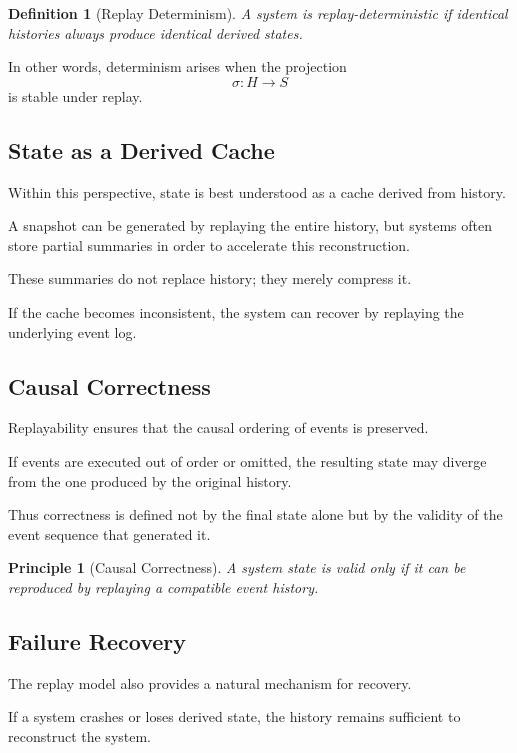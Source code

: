 \documentclass[12pt]{article}
\newtheorem{definition}{Definition}
\newtheorem{principle}{Principle}
\begin{document}
\begin{definition}[Replay Determinism]
A system is \emph{replay-deterministic} if identical
histories always produce identical derived states.
\end{definition}

In other words, determinism arises when the projection
\[
\sigma : H \rightarrow S
\]
is stable under replay.

\subsection{State as a Derived Cache}

Within this perspective, state is best understood as
a cache derived from history.

A snapshot can be generated by replaying the entire history,
but systems often store partial summaries in order to
accelerate this reconstruction.

These summaries do not replace history; they merely
compress it.

If the cache becomes inconsistent, the system can
recover by replaying the underlying event log.

\subsection{Causal Correctness}

Replayability ensures that the causal ordering
of events is preserved.

If events are executed out of order or omitted,
the resulting state may diverge from the one
produced by the original history.

Thus correctness is defined not by the final state
alone but by the validity of the event sequence
that generated it.

\begin{principle}[Causal Correctness]
A system state is valid only if it can be reproduced
by replaying a compatible event history.
\end{principle}

\subsection{Failure Recovery}

The replay model also provides a natural mechanism
for recovery.

If a system crashes or loses derived state,
the history remains sufficient to reconstruct
the system.
\end{document}
